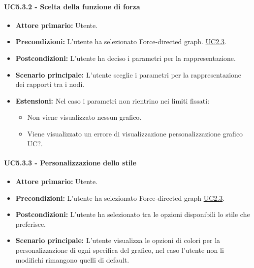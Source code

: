 \paragraph{UC5.3.2 - Scelta della funzione di forza}
\label{sec:UC5.3.2}
    \begin{itemize}
        \item \textbf{Attore primario:} Utente.
        \item \textbf{Precondizioni:} L'utente ha selezionato Force-directed graph. \hyperref[sec:UC2.3]{UC2.3}.
	    \item \textbf{Postcondizioni:} L'utente ha deciso i parametri per la rappresentazione.
	    \item \textbf{Scenario principale:} L'utente sceglie i parametri per la rappresentazione dei rapporti tra i nodi.
	    \item \textbf{Estensioni:} Nel caso i parametri non rientrino nei limiti fissati:
              \begin{itemize}
                  \item Non viene visualizzato nessun grafico.
                  \item Viene visualizzato un errore di visualizzazione personalizzazione grafico \hyperref[sec:UC - Errore di personalizzazione]{UC?}.
              \end{itemize}
    \end{itemize}
\paragraph{UC5.3.3 - Personalizzazione dello stile}
\label{sec:UC5.3.3}
    \begin{itemize}
        \item \textbf{Attore primario:} Utente.
        \item \textbf{Precondizioni:} L'utente ha selezionato Force-directed graph \hyperref[sec:UC2.3]{UC2.3}.
	    \item \textbf{Postcondizioni:} L'utente ha selezionato tra le opzioni disponibili lo stile che preferisce.
	    \item \textbf{Scenario principale:} L'utente visualizza le opzioni di colori per la personalizzazione di ogni specifica del grafico, nel caso l'utente non li modifichi rimangono quelli di default.
    \end{itemize}

